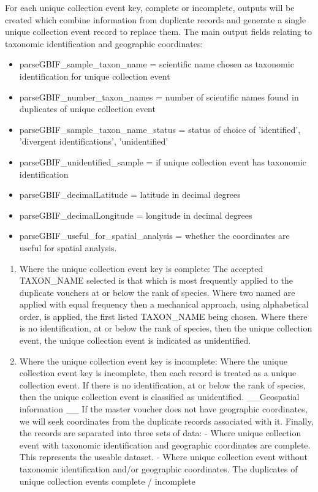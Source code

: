 \documentclass[a4paper]{book}
\begin{document}
%
\begin{Description}
For each unique collection event key, complete or incomplete,
outputs will be created which combine information from duplicate records and generate a
single unique collection event record to replace them.
The main output fields relating to taxonomic identification and geographic coordinates:
\begin{itemize}

\item{} parseGBIF\_sample\_taxon\_name = scientific name chosen as taxonomic identification for unique collection event
\item{} parseGBIF\_number\_taxon\_names = number of scientific names found in duplicates of unique collection event
\item{} parseGBIF\_sample\_taxon\_name\_status = status of choice of 'identified', 'divergent identifications', 'unidentified'
\item{} parseGBIF\_unidentified\_sample = if unique collection event has taxonomic identification
\item{} parseGBIF\_decimalLatitude = latitude in decimal degrees
\item{} parseGBIF\_decimalLongitude = longitude in decimal degrees
\item{} parseGBIF\_useful\_for\_spatial\_analysis = whether the coordinates are useful for spatial analysis.

\end{itemize}

\begin{enumerate}

\item{} Where the unique collection event key is complete:
The accepted TAXON\_NAME selected is that which is most frequently applied to the duplicate vouchers at or below the rank of species.
Where two named are applied with equal frequency then a mechanical approach, using alphabetical order, is applied, the first listed TAXON\_NAME being chosen.
Where there is no identification, at or below the rank of species, then the unique collection event, the unique collection event is indicated as unidentified.
\item{} Where the unique collection event key is incomplete:
Where the unique collection event key is incomplete, then each record is treated as a unique collection event. If there is no identification, at or below the rank of species, then the unique collection event is classified as unidentified.
\_\_Geospatial information \_\_
If the master voucher does not have geographic coordinates, we will seek coordinates from the duplicate records associated with it.
Finally, the records are separated into three sets of data:
 - Where unique collection event with taxonomic identification and geographic coordinates are complete. This represents the useable dataset.
  - Where unique collection event without taxonomic identification and/or geographic coordinates.
 The duplicates of unique collection events complete / incomplete


\end{enumerate}
\end{Description}
\end{document}

